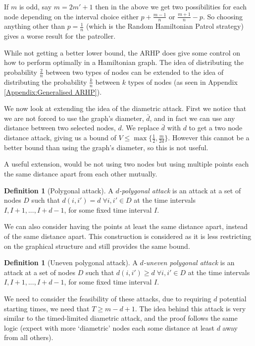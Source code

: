 \documentclass[a4paper,10pt]{article}
\theoremstyle{definition}
\newtheorem{definition}[theorem]{Definition}
\theoremstyle{definition}
\theoremstyle{remark}
\theoremstyle{definition}
\begin{document}
If $m$ is odd, say $m=2m'+1$ then in the above we get two possibilities for each node depending on the interval choice either $p+\frac{m-1}{n}$ or $\frac{m+1}{n}-p$. So choosing anything other than $p=\frac{1}{n}$ (which is the Random Hamiltonian Patrol strategy) gives a worse result for the patroller.

While not getting a better lower bound, the ARHP does give some control on how to perform optimally in a Hamiltonian graph. The idea of distributing the probability $\frac{2}{n}$ between two types of nodes can be extended to the idea of distributing the probability $\frac{k}{n}$ between $k$ types of nodes (as seen in Appendix \ref{Appendix:Generalised ARHP}).


We now look at extending the idea of the diametric attack. First we notice that we are not forced to use the graph's diameter, $\bar{d}$, and in fact we can use any distance between two selected nodes, $d$. We replace $\bar{d}$ with $d$ to get a two node distance attack, giving us a bound of $V \leq \max \{\frac{1}{2} ,\frac{m}{2d} \}$. However this cannot be a better bound than using the graph's diameter, so this is not useful.

A useful extension, would be not using two nodes but using multiple points each the same distance apart from each other mutually.

\begin{definition}[Polygonal attack]
A \textit{$d$-polygonal attack} is an attack at a set of nodes $D$ such that $d(i,i')=d \; \forall i,i' \in D$ at the time intervals $I,I+1,...,I+d-1$, for some fixed time interval $I$.
\end{definition}

We can also consider having the points at least the same distance apart, instead of the same distance apart. This construction is considered as it is less restricting on the graphical structure and still provides the same bound.

\begin{definition}[Uneven polygonal attack]
A \textit{$d$-uneven polygonal attack} is an attack at a set of nodes $D$ such that $d(i,i') \geq d \; \forall i,i' \in D$ at the time intervals $I,I+1,...,I+d-1$, for some fixed time interval $I$.
\end{definition}

We need to consider the feasibility of these attacks, due to requiring $d$ potential starting times, we need that $T \geq m-d+1$. The idea behind this attack is very similar to the timed-limited diametric attack, and the proof follows the same logic (expect with more `diametric' nodes each some distance at least $d$ away from all others).
\end{document}
